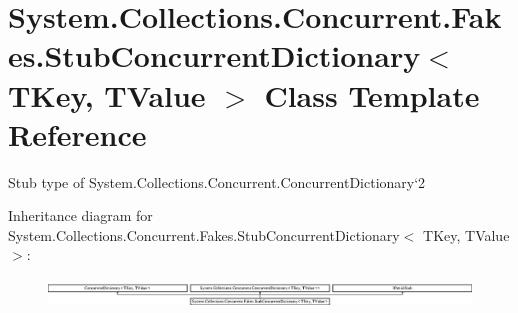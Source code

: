 \hypertarget{class_system_1_1_collections_1_1_concurrent_1_1_fakes_1_1_stub_concurrent_dictionary_3_01_t_key_00_01_t_value_01_4}{\section{System.\-Collections.\-Concurrent.\-Fakes.\-Stub\-Concurrent\-Dictionary$<$ T\-Key, T\-Value $>$ Class Template Reference}
\label{class_system_1_1_collections_1_1_concurrent_1_1_fakes_1_1_stub_concurrent_dictionary_3_01_t_key_00_01_t_value_01_4}
}


Stub type of System.\-Collections.\-Concurrent.\-Concurrent\-Dictionary`2 


Inheritance diagram for System.\-Collections.\-Concurrent.\-Fakes.\-Stub\-Concurrent\-Dictionary$<$ T\-Key, T\-Value $>$\-:\begin{figure}[H]
\begin{center}
\leavevmode
\includegraphics[height=0.769759cm]{class_system_1_1_collections_1_1_concurrent_1_1_fakes_1_1_stub_concurrent_dictionary_3_01_t_key_00_01_t_value_01_4}
\end{center}
\end{figure}
